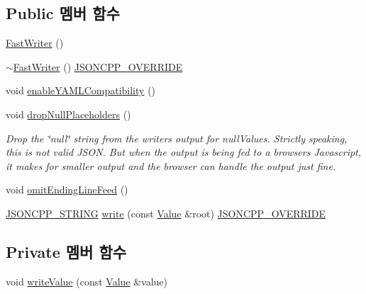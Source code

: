 \subsection*{Public 멤버 함수}
\begin{DoxyCompactItemize}
\item 
\hyperlink{class_json_1_1_fast_writer_a1bbc73ce1a1cc7b09cd1e02db3905170}{Fast\+Writer} ()
\item 
\hyperlink{class_json_1_1_fast_writer_a34152eac509fe00c9b2e15ce2fc94ab8}{$\sim$\+Fast\+Writer} () \hyperlink{json_8h_a824d6199c91488107e443226fa6022c5}{J\+S\+O\+N\+C\+P\+P\+\_\+\+O\+V\+E\+R\+R\+I\+DE}
\item 
void \hyperlink{class_json_1_1_fast_writer_a78d98e9f76d33660ad6e6a1abe287d45}{enable\+Y\+A\+M\+L\+Compatibility} ()
\item 
void \hyperlink{class_json_1_1_fast_writer_a6e93d8dce951e408517311026a065b40}{drop\+Null\+Placeholders} ()
\begin{DoxyCompactList}\small\item\em Drop the \char`\"{}null\char`\"{} string from the writer\textquotesingle{}s output for null\+Values. Strictly speaking, this is not valid J\+S\+ON. But when the output is being fed to a browser\textquotesingle{}s Javascript, it makes for smaller output and the browser can handle the output just fine. \end{DoxyCompactList}\item 
void \hyperlink{class_json_1_1_fast_writer_af4ee077d365d75941fb2688d97207a55}{omit\+Ending\+Line\+Feed} ()
\item 
\hyperlink{json_8h_a1e723f95759de062585bc4a8fd3fa4be}{J\+S\+O\+N\+C\+P\+P\+\_\+\+S\+T\+R\+I\+NG} \hyperlink{class_json_1_1_fast_writer_a93d45ba4bc312371d08beb3e3dfbe654}{write} (const \hyperlink{class_json_1_1_value}{Value} \&root) \hyperlink{json_8h_a824d6199c91488107e443226fa6022c5}{J\+S\+O\+N\+C\+P\+P\+\_\+\+O\+V\+E\+R\+R\+I\+DE}
\end{DoxyCompactItemize}
\subsection*{Private 멤버 함수}
\begin{DoxyCompactItemize}
\item 
void \hyperlink{class_json_1_1_fast_writer_a2ef4a2ce13a341171f01f414f4fdd765}{write\+Value} (const \hyperlink{class_json_1_1_value}{Value} \&value)
\end{DoxyCompactItemize}
